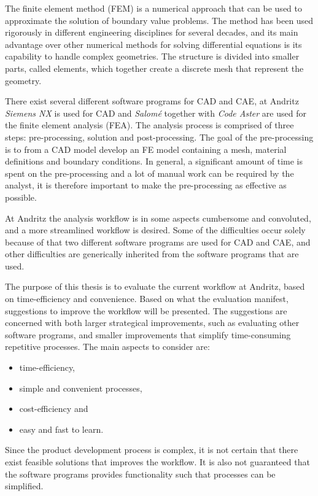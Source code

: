 The finite element method (FEM) is a numerical approach that can be used to approximate the solution of boundary value problems. The method has been used rigorously in different engineering disciplines for several decades, and its main advantage over other numerical methods for solving differential equations is its capability to handle complex geometries. The structure is divided into smaller parts, called elements, which together create a discrete mesh that represent the geometry.~\cite{ottossen92}

There exist several different software programs for CAD and CAE, at Andritz \textit{Siemens NX} is used for CAD and \textit{Salomé} together with \textit{Code Aster} are used for the finite element analysis (FEA). The analysis process is comprised of three steps: pre-processing, solution and post-processing. The goal of the pre-processing is to from a CAD model develop an FE model containing a mesh, material definitions and boundary conditions. In general, a significant amount of time is spent on the pre-processing and a lot of manual work can be required by the analyst, it is therefore important to make the pre-processing as effective as possible.

At Andritz the analysis workflow is in some aspects cumbersome and convoluted, and a more streamlined workflow is desired. Some of the difficulties occur solely because of that two different software programs are used for CAD and CAE, and other difficulties are generically inherited from the software programs that are used.

The purpose of this thesis is to evaluate the current workflow at Andritz, based on time-efficiency and convenience. Based on what the evaluation manifest, suggestions to improve the workflow will be presented. The suggestions are concerned with both larger strategical improvements, such as evaluating other software programs, and smaller improvements that simplify time-consuming repetitive processes. The main aspects to consider are:
\begin{itemize}
	\item time-efficiency,
	\item simple and convenient processes,
	\item cost-efficiency and
	\item easy and fast to learn.
\end{itemize}

Since the product development process is complex, it is not certain that there exist feasible solutions that improves the workflow. It is also not guaranteed that the software programs provides functionality such that processes can be simplified.


